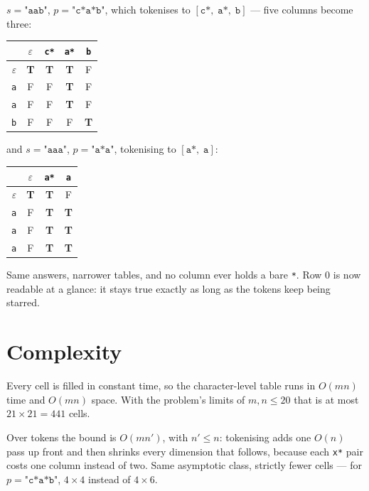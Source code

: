 \documentclass[11pt,a4paper]{article}
\newcommand{\T}{\cellcolor{truecell}\textbf{T}}
\newcommand{\F}{\cellcolor{falsecell}F}
\begin{document}
$s = \texttt{"aab"}$, $p = \texttt{"c*a*b"}$, which tokenises to
$[\texttt{c*},\; \texttt{a*},\; \texttt{b}]$ --- five columns become three:

\begin{center}
\renewcommand{\arraystretch}{1.35}
\begin{tabular}{r|cccc}
  & $\varepsilon$ & \texttt{c*} & \texttt{a*} & \texttt{b}\\
  \midrule
  $\varepsilon$ & \T & \T & \T & \F\\
  \texttt{a}    & \F & \F & \T & \F\\
  \texttt{a}    & \F & \F & \T & \F\\
  \texttt{b}    & \F & \F & \F & \T\\
\end{tabular}
\end{center}

and $s = \texttt{"aaa"}$, $p = \texttt{"a*a"}$, tokenising to $[\texttt{a*},\; \texttt{a}]$:

\begin{center}
\renewcommand{\arraystretch}{1.35}
\begin{tabular}{r|ccc}
  & $\varepsilon$ & \texttt{a*} & \texttt{a}\\
  \midrule
  $\varepsilon$ & \T & \T & \F\\
  \texttt{a}    & \F & \T & \T\\
  \texttt{a}    & \F & \T & \T\\
  \texttt{a}    & \F & \T & \T\\
\end{tabular}
\end{center}

Same answers, narrower tables, and no column ever holds a bare \texttt{*}. Row $0$ is now readable
at a glance: it stays true exactly as long as the tokens keep being starred.

\section{Complexity}

Every cell is filled in constant time, so the character-level table runs in $O(mn)$ time and
$O(mn)$ space. With the problem's limits of $m, n \le 20$ that is at most $21 \times 21 = 441$
cells.

Over tokens the bound is $O(m n')$, with $n' \le n$: tokenising adds one $O(n)$ pass up front and
then shrinks every dimension that follows, because each \texttt{x*} pair costs one column instead
of two. Same asymptotic class, strictly fewer cells --- for $p = \texttt{"c*a*b"}$, $4 \times 4$
instead of $4 \times 6$.
\end{document}
